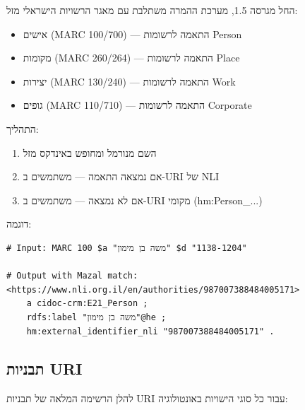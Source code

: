 \documentclass[12pt,a4paper]{article}
\newcommand{\new}[1]{\textcolor{newaddition}{#1}}
\begin{document}
\new{החל מגרסה 1.5, מערכת ההמרה משתלבת עם מאגר הרשויות הישראלי מזל:}

\begin{itemize}
\item \new{אישים \textenglish{(MARC 100/700)} — התאמה לרשומות Person}
\item \new{מקומות \textenglish{(MARC 260/264)} — התאמה לרשומות Place}
\item \new{יצירות \textenglish{(MARC 130/240)} — התאמה לרשומות Work}
\item \new{גופים \textenglish{(MARC 110/710)} — התאמה לרשומות Corporate}
\end{itemize}

\new{התהליך:}
\begin{enumerate}
\item \new{השם מנורמל ומחופש באינדקס מזל}
\item \new{אם נמצאה התאמה — משתמשים ב-URI של NLI}
\item \new{אם לא נמצאה — משתמשים ב-URI מקומי \textenglish{(hm:Person\_...)}}
\end{enumerate}

\new{דוגמה:}
\begin{LTR}
\begin{verbatim}
# Input: MARC 100 $a "משה בן מימון" $d "1138-1204"

# Output with Mazal match:
<https://www.nli.org.il/en/authorities/987007388484005171>
    a cidoc-crm:E21_Person ;
    rdfs:label "משה בן מימון"@he ;
    hm:external_identifier_nli "987007388484005171" .
\end{verbatim}
\end{LTR}

\subsection{תבניות URI}

להלן הרשימה המלאה של תבניות URI עבור כל סוגי הישויות באונטולוגיה:
\end{document}
